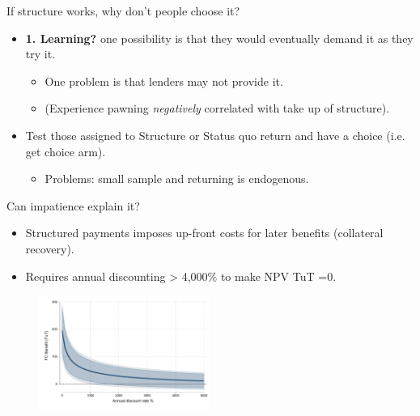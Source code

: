 \documentclass[9pt, aspectratio=169]{beamer}
\begin{document}
\begin{frame}{If structure works, why don't people choose it?}
\begin{itemize}
    \item \textbf{1. Learning?} one possibility is that they would eventually demand it as they try it.
    \begin{itemize}
        \item One problem is that lenders may not provide it.
        \item (Experience pawning \textit{negatively} correlated with take up of structure).
    \end{itemize}
    \vfill \item  Test those assigned to Structure or Status quo return and have a choice (i.e. get choice arm).
        \begin{itemize}
        \item Problems: small sample and returning is endogenous.
    \end{itemize}
 \end{itemize}  
 \vspace{.1in}
\begin{table}[H]
\begin{center}
 \resizebox{0.65\textwidth}{!}{
\small{}
}
\end{center}
\end{table}
\end{frame}



\begin{frame}{Can impatience explain it?}
    \begin{itemize}
    \item  Structured payments imposes up-front costs for later benefits (collateral recovery).  
    \item  Requires annual discounting > 4,000\% to make NPV TuT =0. 
    \end{itemize}
\vspace{.1in}
\begin{figure}[H]
    \begin{center}
        \centering
        \includegraphics[width=0.50\textwidth]{Figuras/discount_effect_tut.pdf}
    \end{center}
\end{figure}   
\end{frame}
\end{document}
